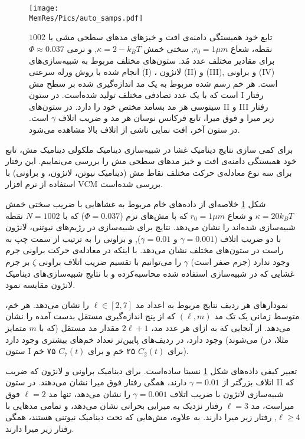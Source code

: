 \begin{figure}[htbp]
\begin{center}
\texttt{[image: \\MemRes/Pics/auto\_samps.pdf]}
\caption{
تابع خود همبستگی دامنه‌ی افت و خیز‌های مد‌های سطحی مشی با 
 $1002$
نقطه، شعاع
 $r_0=1\mu m$,
 سختی خمش
$\kappa=2-k_BT$,
 و نرمی
 $\Phi\approx0.037$
برای مقادیر  مختلف عدد مُد. ستون‌های مختلف مربوط به شبیه‌سازی‌های انجام شده با روش ورله سرعتی
(I)
، لانژون
(II)
و
(III),
 و براونی 
(IV)
است. هر خم رسم شده مربوط به یک مد اندازه‌گیری شده بر سطح مش است که با یک عدد تصادفی مختلف تولید شده‌است. در ستون 
I
رفتار سینوسی هر مد بسامد مختص خود را دارد. در ستون‌های 
II
و
III
رفتار زیر میرا و فوق میرا، تابع فرکانس نوسان هر مد و ضریب اتلاف
 $\gamma$
است. در ستون آخر، افت نمایی ناشی از اتلاف بالا مشاهده می‌شود.
}
\label{fig:autoSampling}
\end{center}
\end{figure}


برای کمی‌ سازی نتایج دینامیک غشا در شبیه‌سازی دینامیک ملکولی دینامیک مش، تابع خود همبستگی دامنه‌ی افت و خیز مد‌های سطحی مش را بررسی می‌نماییم. این رفتار برای سه نوع معادله‌ی حرکت مختلف نقاط مش (دینامیک نیوتن، لانژون، و براونی) با استفاده از نرم افزار VCM بررسی شده‌است. 


شکل
\ref{fig:autoSampling}
خلاصه‌ای از داده‌های خام مربوط به غشاهایی با ضریب سختی خمش 
 $\kappa = 20 k_BT$
و شعاع 
$r_0=1\mu m$
که با مش‌های نرم
($\Phi=0.037$)
 که با 
$N=1002$
نقطه شبیه‌سازی شده‌اند را نشان می‌دهد. نتایج برای شبیه‌سازی در رژیم‌های نیوتنی، لانژون با دو ضریب اتلاف 
($\gamma=0.001$
و
$\gamma=0.01$),
 و براونی را به ترتیب از سمت چپ به راست در ستون‌های مختلف نشان می‌دهد. با اینکه در معادله‌ی حرکت براونی جرم وجود ندارد (جرم صفر است) 
$\gamma$
را می‌توانیم با تقسیم ضریب اتلاف براونی
$\zeta$
بر جرم غشایی که در شبیه‌سازی استفاده شده محاسبه‌کرده و با نتایج شبیه‌سازی‌های دینامیک لانژون مقایسه نمود.

نمودار‌های هر  ردیف‌ نتایج مربوط به اعداد مد
$\ell\in[2,7]$
را نشان می‌دهد. هر خم، متوسط زمانی یک تک مد
$(\ell,m)$
که از پنج اندازه‌گیری مستقل بدست آمده را نشان می‌دهد. از آنجایی که به ازای هر عدد مد،
$2\ell+1$
مقدار مد مستقل (که با
$m$
متمایز می‌شوند) وجود دارد، در ردیف‌های پایین‌تر تعداد خم‌های بیشتری وجود دارد (مثلا، در ستون 
I
برای 
$C_2(t)$
۲۵ خم و برای 
$C_7(t)$
۷۵ خم). 

تعبیر کیفی داده‌های شکل
\ref{fig:autoSampling}
نسبتا ساده‌است. برای دینامیک براونی و لانژون که ضریب اتلاف بزرگتر از 
$\gamma=0.01$
دارند، همگی رفتار فوق میرا نشان می‌دهند. در ستون 
II
که شبیه‌سازی لانژون با ضریب اتلاف
$\gamma=0.001$
را نشان می‌دهد، تنها مد
$\ell=2$
فوق میراست، مد
$\ell=3$
رفتار نزدیک به میرایی بحرانی نشان می‌دهد، و تمامی‌ مد‌هایی با
$\ell\ge4$,
رفتار زیر میرا دارند. به علاوه، مش‌هایی که تحت دینامیک نیوتنی هستند، همگی رفتار زیر میرا دارند.

















